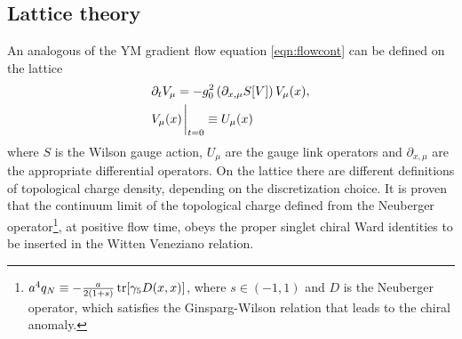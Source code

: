 \subsection{Lattice theory}%
\label{subsec:latticetheory}
An analogous of the YM gradient flow equation \ref{eqn:flowcont} can be defined on the lattice
\begin{align}
  &\partial_t V_{\mu} = -g_{0}^2 \left(\partial_{x,\mu}S[V]\right)V_{\mu}(x), \notag\\ &V_{\mu}(x)\eval_{t=0}\equiv U_{\mu}(x)
\end{align}
where $S$ is the Wilson gauge action, $U_{\mu}$ are the gauge link operators and $\partial_{x,\mu}$ are the appropriate
differential operators.
On the lattice there are  different definitions of topological charge density, depending on the discretization choice. It is proven that the continuum limit of the topological charge defined from the Neuberger operator\footnote{$a^{4}q_{N} \equiv -\frac{a}{2(1+s)}\tr[\gamma_{5}D(x,x)]$, where $s\in(-1,1)$ and $D$ is the Neuberger operator, which satisfies the Ginsparg-Wilson relation that leads to the chiral anomaly.}, at positive flow time, obeys the proper singlet chiral Ward identities to be inserted in the Witten Veneziano relation.

